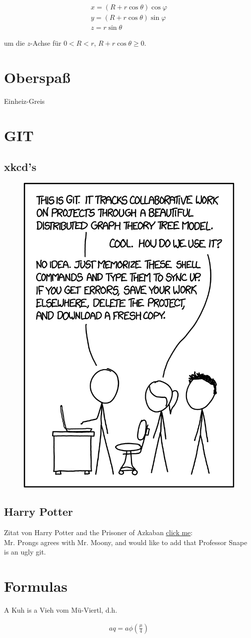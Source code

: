 \documentclass{article}
\begin{document}
\begin{align*}
  x = (R + r \cos{\theta}) \cos{\varphi} \\
  y = (R + r \cos{\theta}) \sin{\varphi} \\
  z = r \sin{\theta}
\end{align*}

um die $z$-Achse für $0 < R < r$, $R + r \cos{\theta} \geq 0$.

\section{Oberspaß}
Einheiz-Greis

\section{GIT}

\subsection{xkcd's}

\begin{figure}[h!]
  \centering
  \includegraphics[width = 0.5 \linewidth]{images/git_2x.png}
\end{figure}

\subsection{Harry Potter}

Zitat von Harry Potter and the Prisoner of Azkaban
\href{https://www.hp-lexicon.org/quote/professor-snape-ugly-git/}{click me}: \\

Mr. Prongs agrees with Mr. Moony, and would like to add that Professor Snape is an ugly git.

\section{Formulas}

A Kuh is a Vieh vom Mü-Viertl, d.h.

\begin{align}
  aq = a \phi \left( \frac{\mu}{4} \right)
\end{align}
\end{document}
